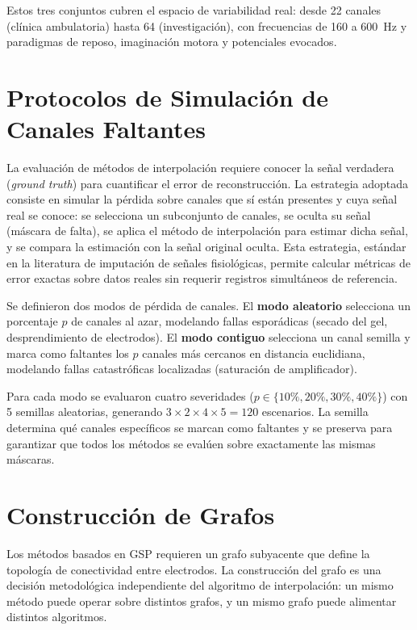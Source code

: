 Estos tres conjuntos cubren el espacio de variabilidad real: desde 22 canales (clínica ambulatoria) hasta 64 (investigación), con frecuencias de 160 a 600~Hz y paradigmas de reposo, imaginación motora y potenciales evocados.
\section{Protocolos de Simulación de Canales Faltantes}

La evaluación de métodos de interpolación requiere conocer la señal verdadera (\textit{ground truth}) para cuantificar el error de reconstrucción. La estrategia adoptada consiste en simular la pérdida sobre canales que sí están presentes y cuya señal real se conoce: se selecciona un subconjunto de canales, se oculta su señal (máscara de falta), se aplica el método de interpolación para estimar dicha señal, y se compara la estimación con la señal original oculta. Esta estrategia, estándar en la literatura de imputación de señales fisiológicas, permite calcular métricas de error exactas sobre datos reales sin requerir registros simultáneos de referencia.

Se definieron dos modos de pérdida de canales. El \textbf{modo aleatorio} selecciona un porcentaje $p$ de canales al azar, modelando fallas esporádicas (secado del gel, desprendimiento de electrodos). El \textbf{modo contiguo} selecciona un canal semilla y marca como faltantes los $p$ canales más cercanos en distancia euclidiana, modelando fallas catastróficas localizadas (saturación de amplificador).

Para cada modo se evaluaron cuatro severidades ($p \in \{10\%, 20\%, 30\%, 40\%\}$) con 5 semillas aleatorias, generando $3 \times 2 \times 4 \times 5 = 120$ escenarios. La semilla determina qué canales específicos se marcan como faltantes y se preserva para garantizar que todos los métodos se evalúen sobre exactamente las mismas máscaras.

\section{Construcción de Grafos}
\label{sec:graph_construction_methods}

Los métodos basados en GSP requieren un grafo subyacente que define la topología de conectividad entre electrodos. La construcción del grafo es una decisión metodológica independiente del algoritmo de interpolación: un mismo método puede operar sobre distintos grafos, y un mismo grafo puede alimentar distintos algoritmos.

